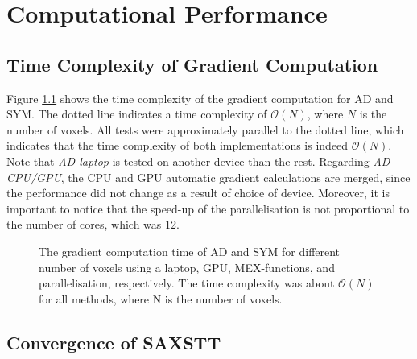 \chapter{Computational Performance}



\section{Time Complexity of Gradient Computation}

Figure \ref{fig:gradient_time_complexity} shows the time complexity of the gradient computation for AD and SYM.
The dotted line indicates a time complexity of $\mathcal{O}(N)$, where $N$ is the number of voxels.
All tests were approximately parallel to the dotted line, which indicates that the time complexity of both implementations is indeed $\mathcal{O}(N)$.
Note that \emph{AD laptop} is tested on another device than the rest.
Regarding \emph{AD CPU/GPU}, the CPU and GPU automatic gradient calculations are merged, since the performance did not change as a result of choice of device.%
Moreover, it is important to notice that the speed-up of the parallelisation is not proportional to the number of cores, which was 12.
\begin{figure}[h!]
    \centering
    
    \caption{ The gradient computation time of AD and SYM for different number of voxels using a laptop, GPU, MEX-functions, and parallelisation, respectively. %
        The time complexity was about $\mathcal{O}(N)$ for all methods, where N is the number of voxels.}
    \label{fig:gradient_time_complexity}
\end{figure}

\clearpage
\section{Convergence of SAXSTT}

